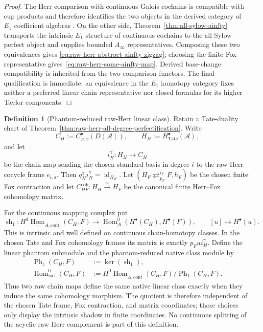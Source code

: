 \documentclass[11pt]{article}
\theoremstyle{definition}
\newtheorem{definition}[theorem]{Definition}
\begin{document}
\begin{proof}
The Herr comparison with continuous Galois cochains is compatible with cup
products and therefore identifies the two objects in the derived category of
$E_1$ coefficient algebras \cite{LiuCohomology,KPXFamilies}.  On the other side,
Theorem~\ref{thm:all-sylow-ainfty} transports the intrinsic $E_1$ structure of
continuous cochains to the all-Sylow perfect object and supplies bounded
$A_\infty$ representatives.  Composing these two equivalences gives
\eqref{eq:raw-herr-abstract-ainfty-zigzag}; choosing the finite Fox
representative gives~\eqref{eq:raw-herr-some-ainfty-map}.  Derived base-change
compatibility is inherited from the two comparison functors.  The final
qualification is immediate: an equivalence in the $E_1$ homotopy category fixes
neither a preferred linear chain representative nor closed formulas for its
higher Taylor components.
\end{proof}

\begin{definition}[Phantom-reduced raw-Herr linear class]\label{def:raw-herr-phantom-reduced-class}
Retain a Tate-duality chart of
Theorem~\ref{thm:raw-herr-all-degree-perfectification}.  Write
\[
 C_H:=C^\bullet_{\varphi,\gamma}(D(\mathcal A)),
 \qquad
 H_H:=H^\bullet_{\mathrm{Tate}}(\mathcal A),
\]
and let
\[
 i_H^\gamma:H_H\longrightarrow C_H
\]
be the chain map sending the chosen standard basis in degree $i$ to the raw
Herr cocycle frame $e_{i,a}$.  Then
$q_H^\gamma i_H^\gamma=\operatorname{id}_{H_H}$.  Let
$(H_F\mathop{\rightleftarrows}^{i_F}_{p_F}F,h_F)$ be the chosen finite Fox
contraction and let
$C_{HF}^{\mathrm{coh}}:H_H\xrightarrow{\sim}H_F$ be the canonical finite
Herr--Fox cohomology matrix.

For the continuous mapping complex put
\begin{equation}\label{eq:raw-herr-linear-shadow-map}
 \operatorname{sh}_1:
 H^0\underline{\operatorname{Hom}}_{A,\mathrm{cont}}(C_H,F)
 \longrightarrow
 \operatorname{Hom}^0_A\!\left(H^\bullet(C_H),H^\bullet(F)\right),
 \qquad
 [u]\longmapsto H^\bullet(u).
\end{equation}
This is intrinsic and well defined on continuous chain-homotopy classes.  In the
chosen Tate and Fox cohomology frames its matrix is exactly $p_Fu i_H^\gamma$.
Define the linear phantom submodule and the phantom-reduced native class module by
\begin{align}
 \operatorname{Ph}_1(C_H,F)
 &:=\ker(\operatorname{sh}_1),
 \label{eq:raw-herr-linear-phantom-submodule}\\
 \operatorname{Hom}^0_{\mathrm{nat}}(C_H,F)
 &:=
 H^0\underline{\operatorname{Hom}}_{A,\mathrm{cont}}(C_H,F)
 \big/\operatorname{Ph}_1(C_H,F).
 \label{eq:raw-herr-phantom-reduced-hom}
\end{align}
Thus two raw chain maps define the same native linear class exactly when they
induce the same cohomology morphism.  The quotient is therefore independent of
the chosen Tate frame, Fox contraction, and matrix coordinates; those choices
only display the intrinsic shadow in finite coordinates.  No continuous
splitting of the acyclic raw Herr complement is part of this definition.
\end{definition}
\end{document}
